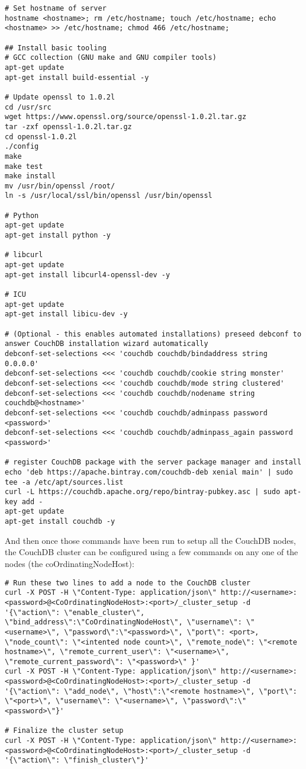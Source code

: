 \begin{verbatim}
# Set hostname of server
hostname <hostname>; rm /etc/hostname; touch /etc/hostname; echo <hostname> >> /etc/hostname; chmod 466 /etc/hostname;

## Install basic tooling 
# GCC collection (GNU make and GNU compiler tools)
apt-get update
apt-get install build-essential -y

# Update openssl to 1.0.2l
cd /usr/src
wget https://www.openssl.org/source/openssl-1.0.2l.tar.gz
tar -zxf openssl-1.0.2l.tar.gz
cd openssl-1.0.2l
./config
make
make test
make install
mv /usr/bin/openssl /root/
ln -s /usr/local/ssl/bin/openssl /usr/bin/openssl

# Python
apt-get update
apt-get install python -y

# libcurl
apt-get update
apt-get install libcurl4-openssl-dev -y

# ICU
apt-get update
apt-get install libicu-dev -y

# (Optional - this enables automated installations) preseed debconf to answer CouchDB installation wizard automatically
debconf-set-selections <<< 'couchdb couchdb/bindaddress string 0.0.0.0'
debconf-set-selections <<< 'couchdb couchdb/cookie string monster'
debconf-set-selections <<< 'couchdb couchdb/mode string clustered'
debconf-set-selections <<< 'couchdb couchdb/nodename string couchdb@<hostname>'
debconf-set-selections <<< 'couchdb couchdb/adminpass password <password>'
debconf-set-selections <<< 'couchdb couchdb/adminpass_again password <password>'

# register CouchDB package with the server package manager and install
echo 'deb https://apache.bintray.com/couchdb-deb xenial main' | sudo tee -a /etc/apt/sources.list
curl -L https://couchdb.apache.org/repo/bintray-pubkey.asc | sudo apt-key add -
apt-get update
apt-get install couchdb -y
\end{verbatim}

And then once those commands have been run to setup all the CouchDB nodes, the CouchDB cluster can be configured using a few commands on any one of the nodes (the coOrdinatingNodeHost):

\begin{verbatim}
# Run these two lines to add a node to the CouchDB cluster
curl -X POST -H \"Content-Type: application/json\" http://<username>:<password>@<CoOrdinatingNodeHost>:<port>/_cluster_setup -d '{\"action\": \"enable_cluster\", \"bind_address\":\"CoOrdinatingNodeHost\", \"username\": \"<username>\", \"password\":\"<password>\", \"port\": <port>, \"node_count\": \"<intented node count>\", \"remote_node\": \"<remote hostname>\", \"remote_current_user\": \"<username>\", \"remote_current_password\": \"<password>\" }'
curl -X POST -H \"Content-Type: application/json\" http://<username>:<password>@<CoOrdinatingNodeHost>:<port>/_cluster_setup -d '{\"action\": \"add_node\", \"host\":\"<remote hostname>\", \"port\": \"<port>\", \"username\": \"<username>\", \"password\":\"<password>\"}'

# Finalize the cluster setup
curl -X POST -H \"Content-Type: application/json\" http://<username>:<password>@<CoOrdinatingNodeHost>:<port>/_cluster_setup -d '{\"action\": \"finish_cluster\"}'
\end{verbatim}

